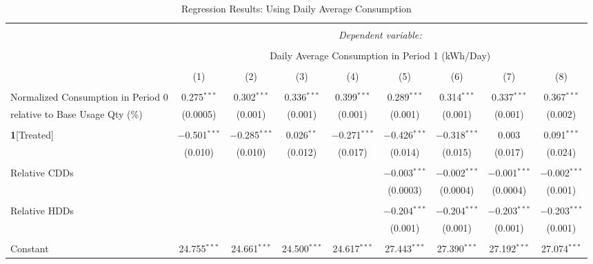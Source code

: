 \begin{table}[!htbp]
\centering 
\caption{Regression Results: Using Daily Average Consumption} 
\label{Table:Regression-Results_Daily-Average} 
\small 

\begin{adjustbox}{scale = 0.9}

\begin{tabular}{@{\extracolsep{5pt}}lcccccccc} 
\\[-1.8ex]\hline 
\hline \\[-1.8ex] 
 & \multicolumn{8}{c}{\textit{Dependent variable:}} \\ 
\cline{2-9} 
\\[-1.8ex] & \multicolumn{8}{c}{Daily Average Consumption in Period 1 (kWh/Day)} \\ 
\\[-1.8ex] & (1) & (2) & (3) & (4) & (5) & (6) & (7) & (8)\\ 
\hline \\[-1.8ex] 
 Normalized Consumption in Period 0 & 0.275$^{***}$ & 0.302$^{***}$ & 0.336$^{***}$ & 0.399$^{***}$ & 0.289$^{***}$ & 0.314$^{***}$ & 0.337$^{***}$ & 0.367$^{***}$ \\ 
relative to Base Usage Qty (\%) & (0.0005) & (0.001) & (0.001) & (0.001) & (0.001) & (0.001) & (0.001) & (0.002) \\ 
  & & & & & & & & \\ 
 \textbf{1}[Treated] & $-$0.501$^{***}$ & $-$0.285$^{***}$ & 0.026$^{**}$ & $-$0.271$^{***}$ & $-$0.426$^{***}$ & $-$0.318$^{***}$ & 0.003 & 0.091$^{***}$ \\ 
  & (0.010) & (0.010) & (0.012) & (0.017) & (0.014) & (0.015) & (0.017) & (0.024) \\ 
  & & & & & & & & \\ 
 Relative CDDs &  &  &  &  & $-$0.003$^{***}$ & $-$0.002$^{***}$ & $-$0.001$^{***}$ & $-$0.002$^{***}$ \\ 
  &  &  &  &  & (0.0003) & (0.0004) & (0.0004) & (0.001) \\ 
  & & & & & & & & \\ 
 Relative HDDs &  &  &  &  & $-$0.204$^{***}$ & $-$0.204$^{***}$ & $-$0.203$^{***}$ & $-$0.203$^{***}$ \\ 
  &  &  &  &  & (0.001) & (0.001) & (0.001) & (0.001) \\ 
  & & & & & & & & \\ 
 Constant & 24.755$^{***}$ & 24.661$^{***}$ & 24.500$^{***}$ & 24.617$^{***}$ & 27.443$^{***}$ & 27.390$^{***}$ & 27.192$^{***}$ & 27.074$^{***}$ \\ 

\end{tabular}
\end{adjustbox}
\end{table}
